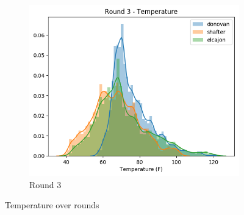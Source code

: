 \documentclass{article}
\begin{document}
\begin{figure}
\begin{subfigure}{0.32\textwidth}
\includegraphics[width=\textwidth]{results/distributions/round3_temperature.png}
\caption{Round 3}
\end{subfigure}
\caption{Temperature over rounds}
\label{fig:temperature-rounds}
\end{figure}
\end{document}
